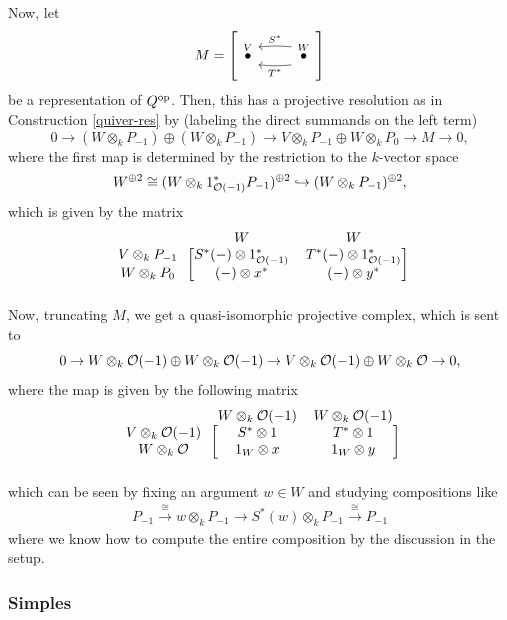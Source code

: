\documentclass[12pt]{article}
\begin{document}
Now, let
\[M =\left[\begin{tikzcd}
    \overset{V}{\bullet} & \overset{W}{\bullet} \lar[shift left=0.2cm, bend left=0.2cm, "T^*"] \lar[shift left=-0.2cm, bend left=-0.2cm, "S^*"']
\end{tikzcd}\right]\]
be a representation of $Q^{\mathrm{op}}$. Then, this has a projective resolution as in Construction \ref{quiver-res} by (labeling the direct summands on the left term)
\[0 \to (W \otimes_k P_{-1}) \oplus (W\otimes_k P_{-1}) \to V \otimes_k P_{-1} \oplus W \otimes_k P_0\to M\to 0,\]
where the first map is determined by the restriction to the $k$-vector space
\[W^{\oplus 2} \cong (W\otimes_k 1_{\mathcal{O}(-1)}^* P_{-1})^{\oplus 2} \hookrightarrow (W\otimes_k P_{-1})^{\oplus 2},\]
which is given by the matrix
\[\begin{blockarray}{ccc}
& W & W\\
\begin{block}{c[cc]}
    V\otimes_k P_{-1} & S^*(-) \otimes 1_{\cO(-1)}^* & T^*(-) \otimes 1_{\cO(-1)}^*\\
    W\otimes_k P_0 & (-) \otimes x^* & (-) \otimes y^* \\
\end{block}
\end{blockarray}\]
Now, truncating $M$, we get a quasi-isomorphic projective complex, which is sent to
\[0 \to W \otimes_k \mathcal{O}(-1) \oplus W\otimes_k \mathcal{O}(-1) \to V\otimes_k \mathcal{O}(-1) \oplus W\otimes_k \mathcal{O} \to 0,\]
where the map is given by the following matrix
\[\begin{blockarray}{ccc}
& W\otimes_k \cO(-1) & W\otimes_k \cO(-1)\\
\begin{block}{c[cc]}
    V\otimes_k \cO(-1) & S^*\otimes 1 & T^*\otimes 1 \\
    W\otimes_k \cO & 1_W \otimes x & 1_W \otimes y \\
\end{block}
\end{blockarray}\]
which can be seen by fixing an argument $w\in W$ and studying compositions like
\begin{align*}
    P_{-1} \xrightarrow{\cong} w\otimes_k P_{-1} \to S^*(w) \otimes_k P_{-1} \xrightarrow{\cong} P_{-1}
\end{align*}
where we know how to compute the entire composition by the discussion in the setup.


\subsubsection{Simples}
\end{document}
